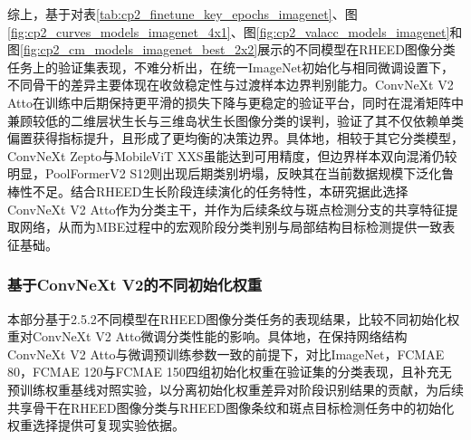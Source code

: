 综上，基于对表\ref{tab:cp2_finetune_key_epochs_imagenet}、图\ref{fig:cp2_curves_models_imagenet_4x1}、图\ref{fig:cp2_valacc_models_imagenet}和图\ref{fig:cp2_cm_models_imagenet_best_2x2}展示的不同模型在RHEED图像分类任务上的验证集表现，不难分析出，在统一ImageNet初始化与相同微调设置下，不同骨干的差异主要体现在收敛稳定性与过渡样本边界判别能力。ConvNeXt V2 Atto在训练中后期保持更平滑的损失下降与更稳定的验证平台，同时在混淆矩阵中兼顾较低的二维层状生长与三维岛状生长图像分类的误判，验证了其不仅依赖单类偏置获得指标提升，且形成了更均衡的决策边界。具体地，相较于其它分类模型，ConvNeXt Zepto与MobileViT XXS虽能达到可用精度，但边界样本双向混淆仍较明显，PoolFormerV2 S12则出现后期类别坍塌，反映其在当前数据规模下泛化鲁棒性不足。结合RHEED生长阶段连续演化的任务特性，本研究据此选择ConvNeXt V2 Atto作为分类主干，并作为后续条纹与斑点检测分支的共享特征提取网络，从而为MBE过程中的宏观阶段分类判别与局部结构目标检测提供一致表征基础。


\subsubsection{基于ConvNeXt V2的不同初始化权重}
本部分基于2.5.2不同模型在RHEED图像分类任务的表现结果，比较不同初始化权重对ConvNeXt V2 Atto微调分类性能的影响。具体地，在保持网络结构ConvNeXt V2 Atto与微调预训练参数一致的前提下，对比ImageNet，FCMAE 80，FCMAE 120与FCMAE 150四组初始化权重在验证集的分类表现，且补充无预训练权重基线对照实验，以分离初始化权重差异对阶段识别结果的贡献，为后续共享骨干在RHEED图像分类与RHEED图像条纹和斑点目标检测任务中的初始化权重选择提供可复现实验依据。


